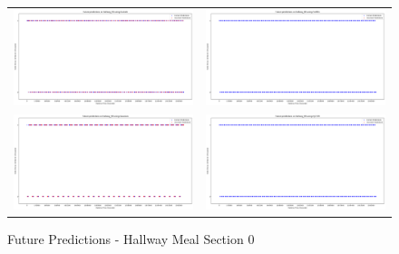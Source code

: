 \begin{figure}
  \begin{tabular}{cc}
    {\includegraphics[width = 3in]{images/results/Future_hallway_M0_Duckett.png}} &
    {\includegraphics[width = 3in]{images/results/Future_hallway_M0_FreMEn.png}} \\
    {\includegraphics[width = 3in]{images/results/Future_hallway_M0_Gaussian.png}} &
    {\includegraphics[width = 3in]{images/results/Future_hallway_M0_HyT-EM.png}} \\
  \end{tabular}
  \caption{Future Predictions - Hallway Meal Section 0}
\end{figure}

